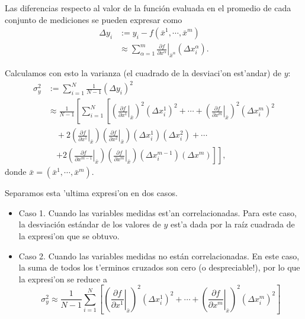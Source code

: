 Las diferencias respecto al valor de la función evaluada en el promedio de cada conjunto de mediciones se pueden expresar como
\begin{align}
\Delta y_i &:= y_i-f(\bar{x}^1,\cdots, \bar{x}^m)\\
&\approx  \sum_{\alpha=1}^m\left.\frac{\partial f}{\partial x^\alpha}\right|_{\bar{x}^\alpha}(\Delta x^\alpha_i).
\end{align}

Calculamos con esto la varianza (el cuadrado de la desviaci'on est'andar) de $y$:
\begin{align}
\sigma_y^2 &:= \sum_{i=1}^N\frac{1}{N-1}(\Delta y_i)^2 \\
&\approx \frac{1}{N-1}\left[\sum_{i=1}^N\left[\left(\left.\frac{\partial f}{\partial x^1}\right|_{\bar{x}}\right)^2 (\Delta x^1_i)^2 +\cdots + \left(\left.\frac{\partial f}{\partial x^m}\right|_{\bar{x}}\right)^2(\Delta x^m_i)^2 \right.\right. \nonumber \\
& \quad +  2\left(\left.\frac{\partial f}{\partial x^1}\right|_{\bar{x}}\right)\left(\left.\frac{\partial f}{\partial x^2}\right|_{\bar{x}}\right)(\Delta x^1_i)(\Delta x^2_i)+\cdots \nonumber\\
& \quad \left.\left.  +2\left(\left.\frac{\partial f}{\partial x^{m-1}}\right|_{\bar{x}}\right) \left(\left.\frac{\partial f}{\partial x^m}\right|_{\bar{x}}\right)(\Delta x^{m-1}_i)(\Delta x^m)\right]\right],
\end{align}
donde $\bar{x}=(\bar{x}^1,\cdots, \bar{x}^m)$.

Separamos esta 'ultima expresi'on en dos casos. 

\begin{itemize}
\item Caso 1. Cuando las variables medidas est'an correlacionadas.
Para este caso, la desviación estándar de los valores de $y$ est'a dada por la raíz cuadrada de la expresi'on que se obtuvo.

\item Caso 2. Cuando las variables medidas no están correlacionadas.
En este caso, la suma de todos los t'erminos cruzados son cero (o despreciable!), por lo que la expresi'on se reduce a
\begin{equation}
\sigma_y^2 \approx \frac{1}{N-1}\sum_{i=1}^N\left[\left(\left.\frac{\partial f}{\partial x^1}\right|_{\bar{x}}\right)^2 (\Delta x^1_i)^2 +\cdots + \left(\left.\frac{\partial f}{\partial x^m}\right|_{\bar{x}}\right)^2(\Delta x^m_i)^2\right]
\end{equation}
\end{itemize}

